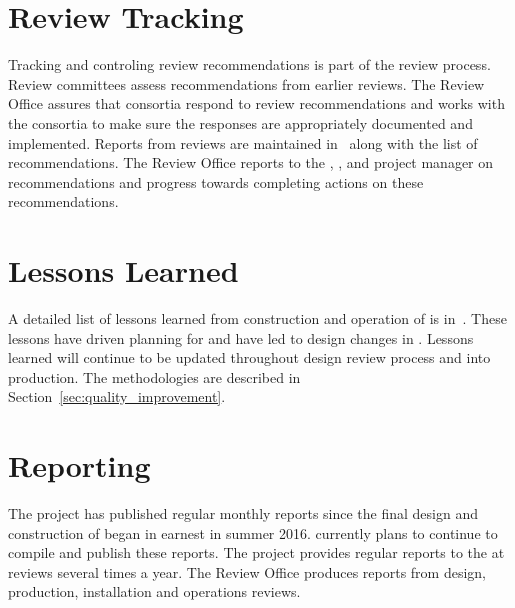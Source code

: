 \section{Review Tracking}

Tracking and controling review recommendations is part of the review
process. Review committees assess recommendations from earlier
reviews. The Review Office assures that consortia respond to review
recommendations and works with the consortia to make sure the
responses are appropriately documented and implemented. Reports from
 reviews are maintained in~ along with the
list of recommendations. The Review Office reports to the ,
, and  project manager on recommendations
and progress towards completing actions on these recommendations.


\section{Lessons Learned}
\label{sec:fdsp-coord-lessons}

A detailed list of lessons learned from construction and operation of
 is in~. These lessons have driven planning for
 and have led to design changes in . Lessons
learned will continue to be updated throughout design review process
and into production. The methodologies are described in
Section~\ref{sec:quality_improvement}. %


\section{Reporting}
\label{sec:fdsp-coord-reporting}

The  project has published regular monthly reports since
the final design and construction of  began in
earnest in summer 2016.  currently plans to continue to compile and
publish these reports. The  project provides
regular reports to the  at reviews several times a
year. The  Review Office produces reports from design,
production, installation and operations reviews.
